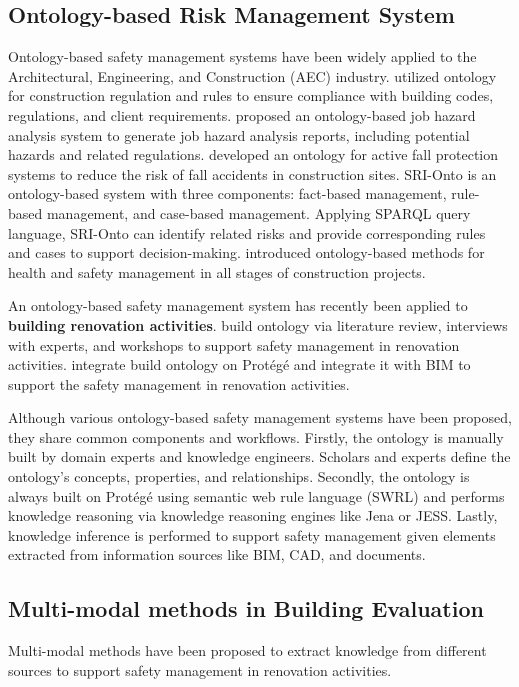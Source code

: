 \subsection*{Ontology-based Risk Management System}
Ontology-based safety management systems have been widely applied to the Architectural, Engineering, and Construction (AEC) industry.
\cite{zhong2015ontological} utilized ontology for construction regulation and rules to ensure compliance with building codes, regulations, and client requirements. \cite{zhang2015ontology,wang2011ontology} proposed an ontology-based job hazard analysis system to generate job hazard analysis reports, including potential hazards and related regulations. 
\cite{guo2017ontology} developed an ontology for active fall protection systems to reduce the risk of fall accidents in construction sites. 
SRI-Onto \cite[]{xing2019ontology} is an ontology-based system with three components: fact-based management, rule-based management, and case-based management. Applying SPARQL query language, 
SRI-Onto can identify related risks and provide corresponding rules and cases to support decision-making. 
\cite{gao2022knowledge} introduced ontology-based methods for health and safety management in all stages of construction projects. 

An ontology-based safety management system has recently been applied to \textbf{building renovation activities}. 
\cite{amorocho2021reno} build ontology via literature review, interviews with experts, and workshops to support safety management in renovation activities. 
\cite{doukari2024ontology} integrate build ontology on Protégé and integrate it with BIM to support the safety management in renovation activities. 

Although various ontology-based safety management systems have been proposed, they share common components and workflows.
Firstly, the ontology is manually built by domain experts and knowledge engineers. Scholars and experts define the ontology's concepts, properties, and relationships.
Secondly, the ontology is always built on Protégé using semantic web rule language (SWRL) and performs knowledge reasoning via knowledge reasoning engines like Jena or JESS.   
Lastly, knowledge inference is performed to support safety management given elements extracted from information sources like BIM, CAD, and documents.  

\subsection*{Multi-modal methods in Building Evaluation}
Multi-modal methods have been proposed to extract knowledge from different sources to support safety management in renovation activities.
